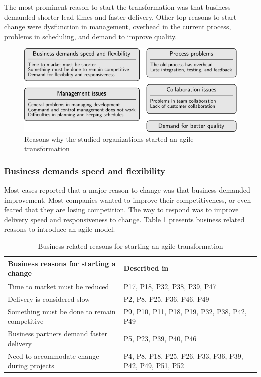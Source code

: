 \documentclass[preprint,authoryear,12pt]{elsarticle}
\begin{document}
The most prominent reason to start the transformation was that business demanded
shorter lead times and faster delivery. Other top reasons to start change were
dysfunction in management, overhead in the current process, problems in
scheduling, and demand to improve quality.


\begin{figure}[h]
  \begin{center}
    \includegraphics{graphics/reasonstochange_summary.pdf}
    \caption{Reasons why the studied organizations started an agile
             transformation}
    \label{fig:reasonstochange_summary}
  \end{center}
\end{figure}

\subsubsection{Business demands speed and flexibility}

Most cases reported that a major reason to change was that business demanded
improvement. Most companies wanted to improve their competitiveness, or even
feared that they are losing competition. The way to respond was to improve
delivery speed and responsiveness to change. Table
\ref{table:reasonstochange_business} presents business related reasons to
introduce an agile model.

\begin{table}
    \centering
    \begin{tabular}{ >{\raggedright\arraybackslash}p{}
                     >{\raggedright\arraybackslash}p{} }
        \toprule
        Business reasons for starting a change   &  Described in  \\
        \midrule
        Time to market must be reduced    &  P17, P18, P32, P38, P39, P47  \\
        Delivery is considered slow       &  P2, P8, P25, P36, P46, P49  \\
        Something must be done to remain competitive  &
                P9, P10, P11, P18, P19, P32, P38, P42, P49  \\
        Business partners demand faster delivery  &  P5, P23, P39, P40, P46  \\
        Need to accommodate change during projects  &
                P4, P8, P18, P25, P26, P33, P36, P39, P42, P49, P51, P52  \\
        \bottomrule
    \end{tabular}
    \caption{Business related reasons for starting an agile transformation}
    \label{table:reasonstochange_business}
\end{table}
\end{document}
